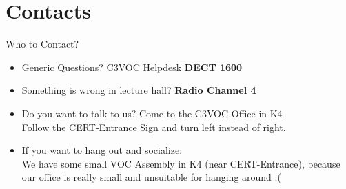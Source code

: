 \documentclass[aspectratio=169]{beamer}
\begin{document}
\section{Contacts}			%
\begin{frame}{Who to Contact?}
\begin{itemize}
	\item Generic Questions? C3VOC Helpdesk \textbf{DECT 1600}
	\item Something is wrong in lecture hall? \textbf{Radio Channel 4}
	\item Do you want to talk to us? Come to the C3VOC Office in K4 \\
	Follow the CERT-Entrance Sign and turn left instead of right.
	\item If you want to hang out and socialize:\\
	We have some small VOC Assembly in K4 (near CERT-Entrance), because our office is really small and unsuitable for hanging around :(
\end{itemize} 
\end{frame}


\end{document}
